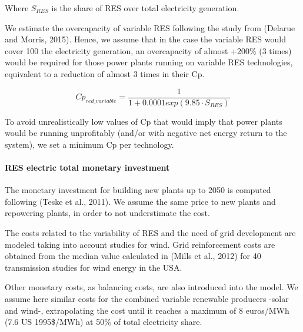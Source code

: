 Where $S_{RES}$ is the share of RES over total electricity generation. 

We estimate the overcapacity of variable RES following the study from (Delarue and Morris, 2015). Hence, we assume that in the case the variable RES would cover 100%
the electricity generation, an overcapacity of almost +200\% (3 times) would be required for those
power plants running on variable RES technologies, equivalent to a reduction of almost 3 times in
their Cp.

\begin{equation}
    Cp_{red\_variable}= \frac {1} {1+0.0001exp(9.85 \cdot S_{RES})}
    \label{eq:cp-reduction-variable}
\end{equation}

To avoid unrealistically low values of Cp that would imply that power plants would be running
unprofitably (and/or with negative net energy return to the system), we set a minimum Cp per
technology.

\paragraph{RES electric total monetary investment}

The monetary investment for building new plants up to 2050 is computed following (Teske et al.,
2011). We assume the same price to new plants and repowering plants, in order to not understimate the cost. 

The costs related to the variability of RES and the need of grid development are modeled taking into account studies for wind. Grid reinforcement costs are obtained from the median value calculated in (Mills et al., 2012)  for 40 transmission studies for wind energy
in the USA.

Other monetary costs, as balancing costs, are also introduced into the model. We assume here similar costs for the combined variable
renewable producers -solar and wind-, extrapolating the cost until it reaches a maximum of 8
euros/MWh (7.6 US 1995\$/MWh) at 50\% of total electricity share.

